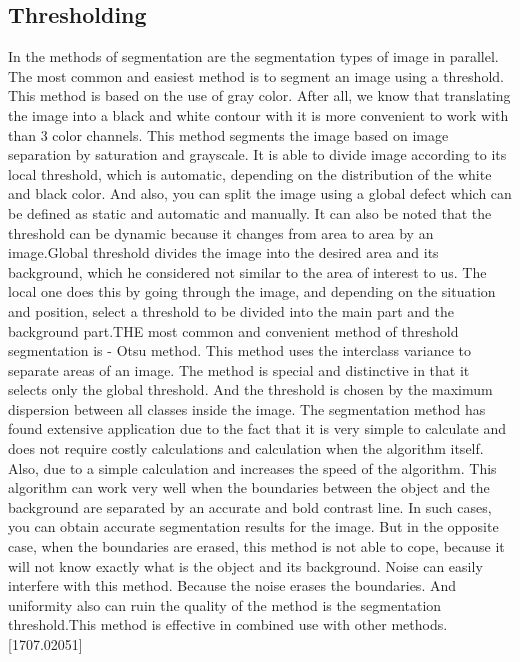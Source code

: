 \subsection{Thresholding}\label{sec:3.4.1}
\par In the methods of segmentation are the segmentation types of image in parallel. The most common and easiest method is to segment an image using a threshold. This method is based on the use of gray color. After all, we know that translating the image into a black and white contour with it is more convenient to work with than 3 color channels. This method segments the image based on image separation by saturation and grayscale. It is able to divide image according to its local threshold, which is automatic, depending on the distribution of the white and black color. And also, you can split the image using a global defect which can be defined as static and automatic and manually. It can also be noted that the threshold can be dynamic because it changes from area to area by an image.Global threshold divides the image into the desired area and its background, which he considered not similar to the area of interest to us. The local one does this by going through the image, and depending on the situation and position, select a threshold to be divided into the main part and the background part.THE most common and convenient method of threshold segmentation is - Otsu method. This method uses the interclass variance to separate areas of an image. The method is special and distinctive in that it selects only the global threshold. And the threshold is chosen by the maximum dispersion between all classes inside the image. The segmentation method has found extensive application due to the fact that it is very simple to calculate and does not require costly calculations and calculation when the algorithm itself. Also, due to a simple calculation and increases the speed of the algorithm. This algorithm can work very well when the boundaries between the object and the background are separated by an accurate and bold contrast line. In such cases, you can obtain accurate segmentation results for the image. But in the opposite case, when the boundaries are erased, this method is not able to cope, because it will not know exactly what is the object and its background. Noise can easily interfere with this method. Because the noise erases the boundaries. And uniformity also can ruin the quality of the method is the segmentation threshold.This method is effective in combined use with other methods.[1707.02051]


